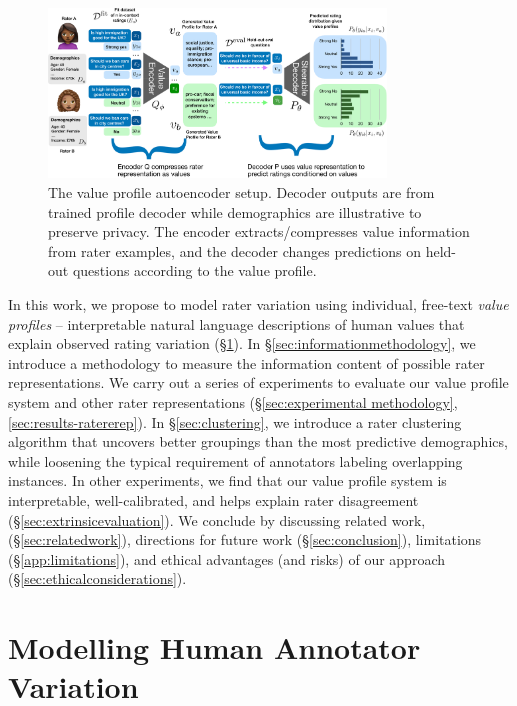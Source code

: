 \documentclass[11pt]{article}
\begin{document}
\begin{figure}[t]
\centering
\includegraphics[width=0.8\textwidth]{files/vp_roma_new.pdf}
\small{
\caption{The value profile autoencoder setup. Decoder outputs are from trained profile decoder while demographics are illustrative to preserve privacy. The encoder extracts/compresses value information from rater examples, and the decoder changes predictions on held-out questions according to the value profile.
}
}
\label{fig:my_label}
\end{figure}

In this work, we propose to model rater variation using individual, free-text {\em value profiles} -- interpretable natural language descriptions of human values that explain observed rating variation (\S \ref{sec:modellingvariation}).
In \S \ref{sec:informationmethodology}, we introduce a methodology to measure the information content of possible rater representations.
We carry out a series of experiments to evaluate our value profile system and other rater representations (\S \ref{sec:experimental methodology}, \ref{sec:results-ratererep}).
In \S \ref{sec:clustering}, we introduce a rater clustering algorithm that uncovers better groupings than the most predictive demographics, while loosening the typical requirement of annotators labeling overlapping instances.
In other experiments, we find that our value profile system is interpretable, well-calibrated, and helps explain rater disagreement (\S \ref{sec:extrinsicevaluation}).
We conclude by discussing related work, (\S \ref{sec:relatedwork}), 
directions for future work (\S \ref{sec:conclusion}),
limitations (\S \ref{app:limitations}),
and ethical advantages (and risks) of our approach (\S \ref{sec:ethicalconsiderations}).

\section{Modelling Human Annotator Variation}
\label{sec:modellingvariation}
\end{document}
